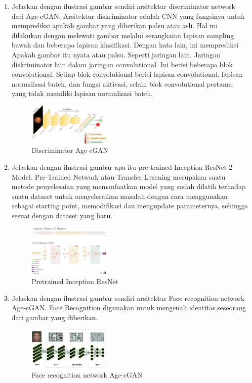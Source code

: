\begin{enumerate}
        \item Jelaskan dengan ilustrasi gambar sendiri arsitektur discriminator network dari Age-cGAN.
		Arsitektur diskriminator adalah CNN yang fungsinya untuk memprediksi apakah gambar yang diberikan palsu atau asli.
        Hal ini dilakukan dengan melewati gambar melalui serangkaian lapisan sampling bawah dan beberapa lapisan klasifikasi. Dengan kata lain, ini memprediksi Apakah gambar itu nyata atau palsu. Seperti jaringan lain, Jaringan diskriminator lain dalam jaringan convolutional. Ini berisi beberapa blok convolutional. Setiap blok convolutional berisi lapisan convolutional, 
        lapisan normalisasi batch, dan fungsi aktivasi, selain blok convolutional pertama, yang tidak memiliki lapisan normalisasi batch.   
		\begin{figure}[H]
			\includegraphics[width=4cm]{figures/1174012/chapter9/teori5.jpg}
            	\centering
           	\caption{Discriminator Age cGAN}
       	\end{figure}


        \item Jelaskan dengan ilustrasi gambar apa itu pre-trained Inception-ResNet-2 Model.
		Pre-Trained Network atau Transfer Learning merupakan suatu metode penyelesaian yang memanfaatkan model yang sudah dilatih terhadap suatu dataset untuk menyelesaikan masalah dengan cara menggunakan sebagai starting point, memodifikasi dan mengupdate parameternya, sehingga sesuai dengan dataset yang baru.
		\begin{figure}[H]
			\includegraphics[width=4cm]{figures/1174012/chapter9/teori6.png}
            	\centering
           	\caption{Pretrained Inception ResNet}
       	\end{figure}

        \item Jelaskan dengan ilustrasi gambar sendiri arsitektur Face recognition network Age-cGAN.
		Face Recognition digunakan untuk mengenali identitas seseorang dari gambar yang diberikan.
		\begin{figure}[H]
			\includegraphics[width=4cm]{figures/1174012/chapter9/teori7.jpg}
            	\centering
           	 \caption{Face recognition network Age-cGAN}
       	 \end{figure}
        

\end{enumerate}
